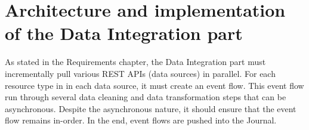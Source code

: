 \chapter{Architecture and implementation of the Data Integration part}

As stated in the Requirements chapter, the Data Integration part must incrementally pull various REST APIs (data sources) in parallel. For each resource type in
in each data source, it must create an event flow. This event flow run through several data cleaning and data transformation steps that can
be asynchronous. Despite the asynchronous nature, it should ensure that the event flow remains in-order. In the end, event flows are pushed
into the Journal.